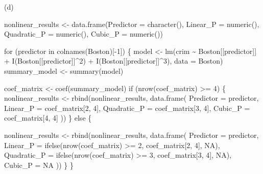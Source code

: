 \documentclass[
]{article}
\newenvironment{Shaded}{\begin{snugshade}}{\end{snugshade}}
\newcommand{\AttributeTok}[1]{\textcolor[rgb]{0.40,0.45,0.13}{#1}}
\newcommand{\ConstantTok}[1]{\textcolor[rgb]{0.56,0.35,0.01}{#1}}
\newcommand{\ControlFlowTok}[1]{\textcolor[rgb]{0.00,0.23,0.31}{#1}}
\newcommand{\DecValTok}[1]{\textcolor[rgb]{0.68,0.00,0.00}{#1}}
\newcommand{\FunctionTok}[1]{\textcolor[rgb]{0.28,0.35,0.67}{#1}}
\newcommand{\NormalTok}[1]{\textcolor[rgb]{0.00,0.23,0.31}{#1}}
\newcommand{\OtherTok}[1]{\textcolor[rgb]{0.00,0.23,0.31}{#1}}
\newcommand{\SpecialCharTok}[1]{\textcolor[rgb]{0.37,0.37,0.37}{#1}}
\begin{document}
(d)

\begin{Shaded}
\begin{Highlighting}[]
\NormalTok{nonlinear\_results }\OtherTok{\textless{}{-}} \FunctionTok{data.frame}\NormalTok{(}\AttributeTok{Predictor =} \FunctionTok{character}\NormalTok{(), }\AttributeTok{Linear\_P =} \FunctionTok{numeric}\NormalTok{(), }\AttributeTok{Quadratic\_P =} \FunctionTok{numeric}\NormalTok{(), }\AttributeTok{Cubic\_P =} \FunctionTok{numeric}\NormalTok{())}

\ControlFlowTok{for}\NormalTok{ (predictor }\ControlFlowTok{in} \FunctionTok{colnames}\NormalTok{(Boston)[}\SpecialCharTok{{-}}\DecValTok{1}\NormalTok{]) \{}
\NormalTok{  model }\OtherTok{\textless{}{-}} \FunctionTok{lm}\NormalTok{(crim }\SpecialCharTok{\textasciitilde{}}\NormalTok{ Boston[[predictor]] }\SpecialCharTok{+} \FunctionTok{I}\NormalTok{(Boston[[predictor]]}\SpecialCharTok{\^{}}\DecValTok{2}\NormalTok{) }\SpecialCharTok{+} \FunctionTok{I}\NormalTok{(Boston[[predictor]]}\SpecialCharTok{\^{}}\DecValTok{3}\NormalTok{), }\AttributeTok{data =}\NormalTok{ Boston)}
\NormalTok{  summary\_model }\OtherTok{\textless{}{-}} \FunctionTok{summary}\NormalTok{(model)}

\NormalTok{  coef\_matrix }\OtherTok{\textless{}{-}} \FunctionTok{coef}\NormalTok{(summary\_model)}
  \ControlFlowTok{if}\NormalTok{ (}\FunctionTok{nrow}\NormalTok{(coef\_matrix) }\SpecialCharTok{\textgreater{}=} \DecValTok{4}\NormalTok{) \{  }
\NormalTok{    nonlinear\_results }\OtherTok{\textless{}{-}} \FunctionTok{rbind}\NormalTok{(nonlinear\_results, }\FunctionTok{data.frame}\NormalTok{(}
      \AttributeTok{Predictor =}\NormalTok{ predictor,}
      \AttributeTok{Linear\_P =}\NormalTok{ coef\_matrix[}\DecValTok{2}\NormalTok{, }\DecValTok{4}\NormalTok{],       }
      \AttributeTok{Quadratic\_P =}\NormalTok{ coef\_matrix[}\DecValTok{3}\NormalTok{, }\DecValTok{4}\NormalTok{],    }
      \AttributeTok{Cubic\_P =}\NormalTok{ coef\_matrix[}\DecValTok{4}\NormalTok{, }\DecValTok{4}\NormalTok{]       }
\NormalTok{    ))}
\NormalTok{  \} }\ControlFlowTok{else}\NormalTok{ \{}
 
\NormalTok{    nonlinear\_results }\OtherTok{\textless{}{-}} \FunctionTok{rbind}\NormalTok{(nonlinear\_results, }\FunctionTok{data.frame}\NormalTok{(}
      \AttributeTok{Predictor =}\NormalTok{ predictor,}
      \AttributeTok{Linear\_P =} \FunctionTok{ifelse}\NormalTok{(}\FunctionTok{nrow}\NormalTok{(coef\_matrix) }\SpecialCharTok{\textgreater{}=} \DecValTok{2}\NormalTok{, coef\_matrix[}\DecValTok{2}\NormalTok{, }\DecValTok{4}\NormalTok{], }\ConstantTok{NA}\NormalTok{),}
      \AttributeTok{Quadratic\_P =} \FunctionTok{ifelse}\NormalTok{(}\FunctionTok{nrow}\NormalTok{(coef\_matrix) }\SpecialCharTok{\textgreater{}=} \DecValTok{3}\NormalTok{, coef\_matrix[}\DecValTok{3}\NormalTok{, }\DecValTok{4}\NormalTok{], }\ConstantTok{NA}\NormalTok{),}
      \AttributeTok{Cubic\_P =} \ConstantTok{NA}
\NormalTok{    ))}
\NormalTok{  \}}
\NormalTok{\}}
 

\end{Highlighting}
\end{Shaded}
\end{document}
